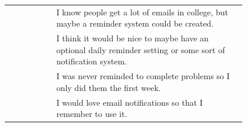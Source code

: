 \begin{longtable}{r|p{0.8\linewidth}}
		& I know people get a lot of emails in college, but maybe a reminder system could be created.                                                                                                                                                                                                                                                                                                                                                                                                                                                                                                                                                                                                                                                      \\
		& I think it would be nice to maybe have an optional daily reminder setting or some sort of notification system.                                                                                                                                                                                                                                                                                                                                                                                                                                                                                                                                                                                                                                   \\
		& I was never reminded to complete problems so I only did them the first week.                                                                                                                                                                                                                                                                                                                                                                                                                                                                                                                                                                                                                                                                     \\
		& I would love email notifications so that I remember to use it.                                                                                                                                                                                                                                                                                                                                                                                                                                                                                                                                                                                                                                                                                   \\

\end{longtable}
